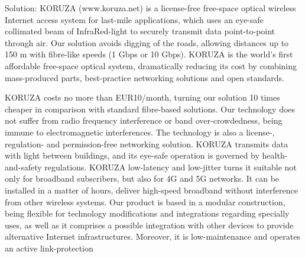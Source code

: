 

Solution: KORUZA (www.koruza.net) is a license-free free-space optical wireless Internet access system for last-mile applications, which uses an eye-safe collimated beam of InfraRed-light to securely transmit data point-to-point through air. Our solution avoids digging of the roads, allowing distances up to 150 m with fibre-like speeds (1 Gbps or 10 Gbps). KORUZA is the world’s first affordable free-space optical system, dramatically reducing its cost by combining mass-produced parts, best-practice networking solutions and open standards.

KORUZA costs no more than EUR10/month, turning our solution 10 times cheaper in comparison with standard fibre-based solutions. Our technology does not suffer from radio frequency interference or band over-crowdedness, being immune to electromagnetic interferences.  The technology is also a license-, regulation- and permission-free networking solution. KORUZA transmits data with light between buildings, and its eye-safe operation is governed by health-and-safety regulations. 
KORUZA low-latency and low-jitter turns it suitable not only for broadband subscribers, but also for 4G and 5G networks. It can be installed in a matter of hours, deliver high-speed broadband without interference from other wireless systems. Our product is based in a modular construction, being flexible for technology modifications and integrations regarding specially uses, as well as it comprises a possible integration with other devices to provide alternative Internet infrastructures. Moreover, it is low-maintenance and operates an active link-protection

